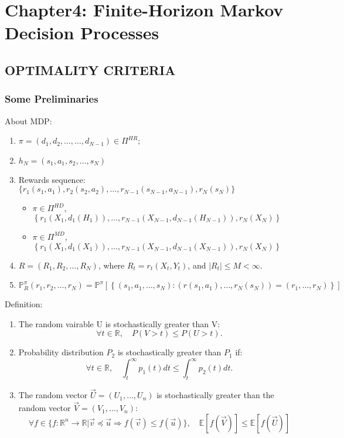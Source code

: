 
\section{Chapter4: Finite-Horizon Markov Decision Processes}%
\label{sec:chapter4}

\subsection{OPTIMALITY CRITERIA}%
\label{sub:optimality_criteria}

\subsubsection{Some Preliminaries}%
\label{subsub:some_preliminaries}

About MDP:\@
\begin{enumerate}
    \item $ \pi = (d_1, d_2, \ldots, \ldots, d_{N-1}) \in \Pi^{HR}$;
    \item $ h_N = (s_1, a_1, s_2, \ldots, s_N) $ 
    \item Rewards sequence: $ \{ r_1(s_1, a_1), r_2(s_2,a_2), \ldots, r_{N-1}(s_{N-1}, a_{N-1}), r_N(s_N) \} $ 
        \begin{itemize}
            \item $ \pi \in \Pi^{HD} $, $ \left\{ r_1(X_1, d_1(H_1)), \ldots, r_{N-1}(X_{N-1}, d_{N-1}(H_{N-1})), r_N(X_N) \right\} $ 
            \item $ \pi \in \Pi^{MD} $, $ \left\{ r_1(X_1, d_1(X_1)), \ldots, r_{N-1}(X_{N-1}, d_{N-1}(X_{N-1})), r_N(X_N) \right\} $ 
        \end{itemize}
    \item $ R = (R_1, R_2, \ldots, R_N) $, where $ R_t = r_t(X_t, Y_t) $, and $ |R_t| \le M < \infty $.
    \item $ \mathbb{P}^\pi_{R} (r_1, r_2, \ldots, r_N) = \mathbb{P}^\pi 
        \left[ \left\{ (s_1, a_1, \ldots, s_N):(r(s_1, a_1),\ldots, r_N(s_N)) = (r_1, \ldots, r_N) \right\} \right]$ 
\end{enumerate}

Definition:
\begin{enumerate}
    \item The random vairable U is stochastically greater than V:\@ 
        \[
            \forall t \in \mathbb{R},\quad P(V > t) \le P(U > t).
        \]
    \item Probability distribution $ P_2 $ is stochastically greater than $ P_1 $ if:
        \[
            \forall t \in \mathbb{R},\quad \int^\infty_t p_1(t) dt \le \int^\infty_t p_2(t)dt.
        \]
    \item The random vector $ \vec U = (U_1, \ldots, U_n) $ is stochastically greater than the random vector $ \vec V = (V_1, \ldots, V_n) $:
        \[
          \forall f \in \{ f: \mathbb{R}^n \rightarrow \mathbb{R} | \vec v \preceq \vec u \Rightarrow f(\vec v) \le f(\vec u) \},\quad
          \mathbb{E}[f(\vec V)] \le \mathbb{E}[f(\vec U)]
        \]
\end{enumerate}

